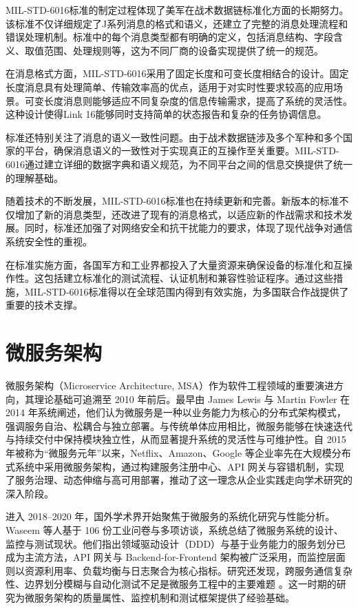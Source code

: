 MIL-STD-6016标准的制定过程体现了美军在战术数据链标准化方面的长期努力。该标准不仅详细规定了J系列消息的格式和语义，还建立了完整的消息处理流程和错误处理机制。标准中的每个消息类型都有明确的定义，包括消息结构、字段含义、取值范围、处理规则等，这为不同厂商的设备实现提供了统一的规范。

在消息格式方面，MIL-STD-6016采用了固定长度和可变长度相结合的设计。固定长度消息具有处理简单、传输效率高的优点，适用于对实时性要求较高的应用场景。可变长度消息则能够适应不同复杂度的信息传输需求，提高了系统的灵活性。这种设计使得Link 16能够同时支持简单的状态报告和复杂的任务协调信息。

标准还特别关注了消息的语义一致性问题。由于战术数据链涉及多个军种和多个国家的平台，确保消息语义的一致性对于实现真正的互操作至关重要。MIL-STD-6016通过建立详细的数据字典和语义规范，为不同平台之间的信息交换提供了统一的理解基础。

随着技术的不断发展，MIL-STD-6016标准也在持续更新和完善。新版本的标准不仅增加了新的消息类型，还改进了现有的消息格式，以适应新的作战需求和技术发展。同时，标准还加强了对网络安全和抗干扰能力的要求，体现了现代战争对通信系统安全性的重视。

在标准实施方面，各国军方和工业界都投入了大量资源来确保设备的标准化和互操作性。这包括建立标准化的测试流程、认证机制和兼容性验证程序。通过这些措施，MIL-STD-6016标准得以在全球范围内得到有效实施，为多国联合作战提供了重要的技术支撑。

\section{微服务架构}

微服务架构（Microservice Architecture, MSA）作为软件工程领域的重要演进方向，其理论基础可追溯至 2010 年前后。最早由 James Lewis 与 Martin Fowler 在 2014 年系统阐述，他们认为微服务是一种以业务能力为核心的分布式架构模式，强调服务自治、松耦合与独立部署。与传统单体应用相比，微服务能够在快速迭代与持续交付中保持模块独立性，从而显著提升系统的灵活性与可维护性。自 2015 年被称为“微服务元年”以来，Netflix、Amazon、Google 等企业率先在大规模分布式系统中采用微服务架构，通过构建服务注册中心、API 网关与容错机制，实现了服务治理、动态伸缩与高可用部署，推动了这一理念从企业实践走向学术研究的深入阶段。

进入 2018–2020 年，国外学术界开始聚焦于微服务的系统化研究与性能分析。Waseem 等人基于 106 份工业问卷与多项访谈，系统总结了微服务系统的设计、监控与测试现状。他们指出领域驱动设计（DDD）与基于业务能力的服务划分已成为主流方法，API 网关与 Backend-for-Frontend 架构被广泛采用，而监控层面则以资源利用率、负载均衡与日志聚合为核心指标。研究还发现，跨服务通信复杂性、边界划分模糊与自动化测试不足是微服务工程中的主要难题 \cite{Waseem2021Design}。这一时期的研究为微服务架构的质量属性、监控机制和测试框架提供了经验基础。

